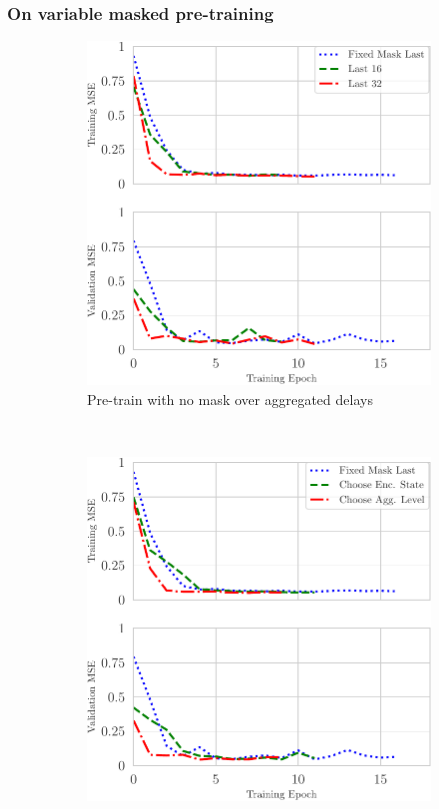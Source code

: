\documentclass{beamer}
\begin{document}
\begin{frame}
\frametitle{On variable masked pre-training}


\begin{figure}[h]
    \centering
    \begin{subfigure}[h]{0.5\textwidth}
        \centering
        \includegraphics[scale=0.5]{figures/finetune_mct_loss_comparison.pdf}
        \caption{Pre-train with no mask over aggregated delays}
    \end{subfigure}%
    ~ 
    \begin{subfigure}[h]{0.5\textwidth}
        \centering
        \includegraphics[scale=0.5]{figures/finetune_mct_loss_comparison_agg.pdf}

\end{subfigure}
\end{figure}
\end{frame}
\end{document}
